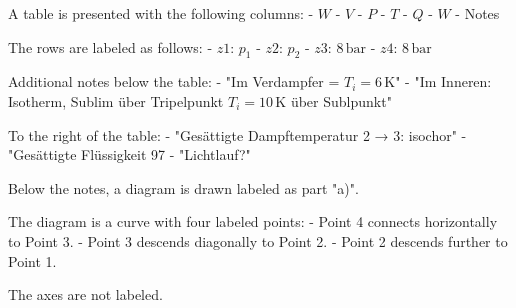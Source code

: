 A table is presented with the following columns:  
- \( W \)  
- \( V \)  
- \( P \)  
- \( T \)  
- \( Q \)  
- \( W \)  
- Notes  

The rows are labeled as follows:  
- \( z1 \): \( p_1 \)  
- \( z2 \): \( p_2 \)  
- \( z3 \): \( 8 \, \text{bar} \)  
- \( z4 \): \( 8 \, \text{bar} \)  

Additional notes below the table:  
- "Im Verdampfer = \( T_i = 6 \, \text{K} \)"  
- "Im Inneren: Isotherm, Sublim über Tripelpunkt \( T_i = 10 \, \text{K} \) über Sublpunkt"  

To the right of the table:  
- "Gesättigte Dampftemperatur 2 → 3: isochor"  
- "Gesättigte Flüssigkeit 97%
- "Lichtlauf?"  

Below the notes, a diagram is drawn labeled as part "a)".  

The diagram is a curve with four labeled points:  
- Point 4 connects horizontally to Point 3.  
- Point 3 descends diagonally to Point 2.  
- Point 2 descends further to Point 1.  

The axes are not labeled.